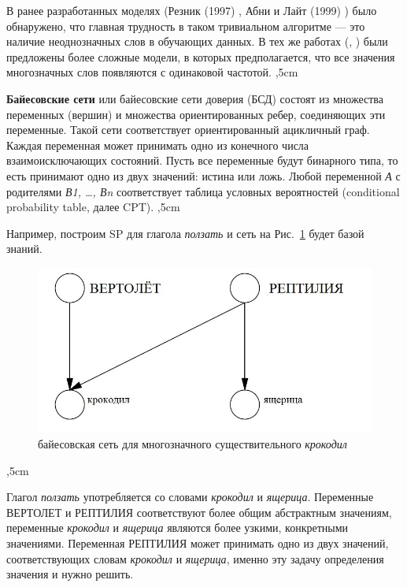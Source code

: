 \documentclass{article}
\begin{document}
\begin{articletext}
В ранее разработанных моделях (Резник (1997) \cite{Resnik 1997}, Абни и Лайт (1999) \cite{Abney 1999}) было обнаружено, что главная трудность в таком тривиальном алгоритме --- это наличие неоднозначных слов в обучающих данных. В тех же работах (\cite{Resnik 1997}, \cite{Abney 1999}) были предложены более сложные модели, в которых предполагается, что все значения многозначных слов появляются с одинаковой частотой. 
,5cm

\textbf{Байесовские сети} или байесовские сети доверия (БСД) состоят из множества переменных (вершин) и множества ориентированных ребер, соединяющих эти переменные. Такой сети соответствует ориентированный ацикличный граф. Каждая переменная может принимать одно из конечного числа взаимоисключающих состояний. Пусть все переменные будут бинарного типа, то есть принимают одно из двух значений: истина или ложь. Любой переменной \textit{А} с родителями \textit{В1, …, Вn} соответствует таблица условных вероятностей (conditional probability table, далее CPT).
,5cm

Например, построим SP для глагола \textit{ползать} и сеть на Рис.~\ref{ris1} будет базой знаний.
\begin{figure}[H]
    \includegraphics[keepaspectratio=true,width=0.9\columnwidth]{bayesian_network_crocodile.jpg}
    \caption{байесовская сеть для многозначного существительного \textit{крокодил}}
    \label{ris1}
\end{figure}
,5cm

Глагол \textit{ползать} употребляется со словами \textit{крокодил} и \textit{ящерица}. Переменные ВЕРТОЛЕТ и РЕПТИЛИЯ соответствуют более общим абстрактным значениям, переменные \textit{крокодил} и \textit{ящерица} являются более узкими, конкретными значениями. Переменная РЕПТИЛИЯ может принимать одно из двух значений, соответствующих словам \textit{крокодил} и \textit{ящерица}, именно эту задачу определения значения и нужно решить.


\end{articletext}
\end{document}
